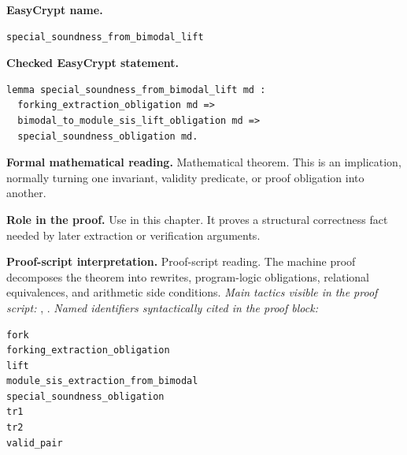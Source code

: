 \begin{formaltheorem}
\noindent\textbf{EasyCrypt name.}
\begin{lstlisting}[language=EasyCrypt,basicstyle=\ttfamily\scriptsize]
special_soundness_from_bimodal_lift
\end{lstlisting}
\noindent\textbf{Checked EasyCrypt statement.}
\begin{lstlisting}[language=EasyCrypt,basicstyle=\ttfamily\scriptsize]
lemma special_soundness_from_bimodal_lift md :
  forking_extraction_obligation md =>
  bimodal_to_module_sis_lift_obligation md =>
  special_soundness_obligation md.
\end{lstlisting}
\noindent\textbf{Formal mathematical reading.}
Mathematical theorem. This is an implication, normally turning one invariant, validity predicate, or proof obligation into another.

\noindent\textbf{Role in the proof.}
Use in this chapter. It proves a structural correctness fact needed by later extraction or verification arguments.

\noindent\textbf{Proof-script interpretation.}
Proof-script reading. The machine proof decomposes the theorem into rewrites, program-logic obligations, relational equivalences, and arithmetic side conditions.
\emph{Main tactics visible in the proof script:} , .
\emph{Named identifiers syntactically cited in the proof block:}
\begin{lstlisting}[language=EasyCrypt,basicstyle=\ttfamily\scriptsize]
fork
forking_extraction_obligation
lift
module_sis_extraction_from_bimodal
special_soundness_obligation
tr1
tr2
valid_pair
\end{lstlisting}

\end{formaltheorem}

